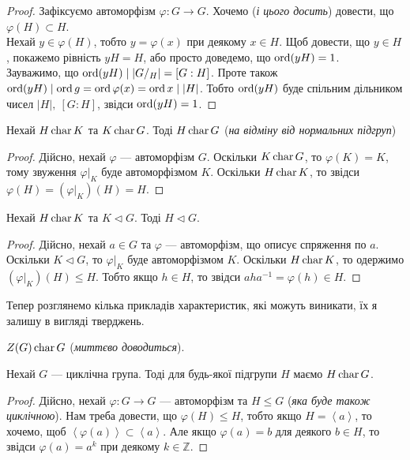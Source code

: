 \documentclass{math_library}
\begin{document}
\begin{proof}
Зафіксуємо автоморфізм $\varphi \colon G \to G$. Хочемо (\textit{і цього досить}) довести, що $\varphi(H) \subset H$.\\
Нехай $y \in \varphi(H)$, тобто $y = \varphi(x)$ при деякому $x \in H$. Щоб довести, що $y \in H$, покажемо рівність $yH = H$, або просто доведемо, що $\operatorname{ord}(yH) = 1$.\\
Зауважимо, що $\operatorname{ord}(yH) \mid |G/_H| = [G:H]$. Проте також $\operatorname{ord}(yH) \mid \operatorname{ord} g = \operatorname{ord} \varphi(x) = \operatorname{ord} x \mid |H|$. Тобто $\operatorname{ord}(yH)$ буде спільним дільником чисел $|H|,\ [G:H]$, звідси $\operatorname{ord}(yH) = 1$.
\end{proof}

\begin{proposition}
Нехай $H \operatorname{char} K$ та $K \operatorname{char} G$. Тоді $H \operatorname{char} G$ (\textit{на відміну від нормальних підгруп})
\end{proposition}

\begin{proof}
Дійсно, нехай $\varphi$ --- автоморфізм $G$. Оскільки $K \operatorname{char} G$, то $\varphi(K) = K$, тому звуження $\varphi|_K$ буде автоморфізмом $K$. Оскільки $H \operatorname{char} K$, то звідси $\varphi(H) = (\varphi|_K)(H) = H$.
\end{proof}

\begin{proposition}
Нехай $H \operatorname{char} K$ та $K \triangleleft G$. Тоді $H \triangleleft G$.
\end{proposition}

\begin{proof}
Дійсно, нехай $a \in G$ та $\varphi$ --- автоморфізм, що описує спряження по $a$. Оскільки $K \triangleleft G$, то $\varphi|_K$ буде автоморфізмом $K$. Оскільки $H \operatorname{char} K$, то одержимо $(\varphi|_K)(H) \leq H$. Тобто якщо $h \in H$, то звідси $aha^{-1} = \varphi(h) \in H$.
\end{proof}

Тепер розглянемо кілька прикладів характеристик, які можуть виникати, їх я залишу в вигляді тверджень.

\begin{proposition}
$Z(G) \operatorname{char} G$ (\textit{миттєво доводиться}).
\end{proposition}

\begin{proposition}
Нехай $G$ --- циклічна група. Тоді для будь-якої підгрупи $H$ маємо $H \operatorname{char} G$.
\end{proposition}

\begin{proof}
Дійсно, нехай $\varphi \colon G \to G$ --- автоморфізм та $H \leq G$ (\textit{яка буде також циклічною}). Нам треба довести, що $\varphi(H) \leq H$, тобто якщо $H = \left<a\right>$, то хочемо, щоб $\left<\varphi(a)\right> \subset \left<a\right>$. Але якщо $\varphi(a) = b$ для деякого $b \in H$, то звідси $\varphi(a) = a^k$ при деякому $k \in \mathbb{Z}$.
\end{proof}
\end{document}

